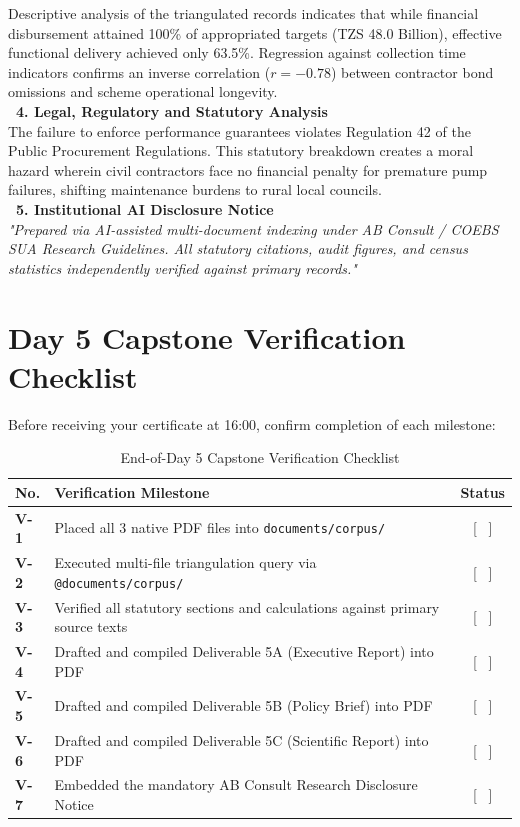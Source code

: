 \documentclass[11pt, a4paper]{report}
\begin{document}
\begin{tcolorbox}[colback=lightgrey, colframe=bordergrey, title=\textbf{Deliverable 5C Preview: \texttt{Report3\_Scientific\_Water\_Oversight.md}}]
Descriptive analysis of the triangulated records indicates that while financial disbursement attained 100\% of appropriated targets (TZS 48.0 Billion), effective functional delivery achieved only 63.5\%. Regression against collection time indicators confirms an inverse correlation ($r = -0.78$) between contractor bond omissions and scheme operational longevity.\\[0.2cm]
\textcolor{tanzaniablue}{\textbf{\ 4. Legal, Regulatory and Statutory Analysis}}\\
The failure to enforce performance guarantees violates Regulation 42 of the Public Procurement Regulations. This statutory breakdown creates a moral hazard wherein civil contractors face no financial penalty for premature pump failures, shifting maintenance burdens to rural local councils.\\[0.2cm]
\textcolor{tanzaniablue}{\textbf{\ 5. Institutional AI Disclosure Notice}}\\
\textit{"Prepared via AI-assisted multi-document indexing under AB Consult / COEBS SUA Research Guidelines. All statutory citations, audit figures, and census statistics independently verified against primary records."}
\end{tcolorbox}

\section{Day 5 Capstone Verification Checklist}
Before receiving your certificate at 16:00, confirm completion of each milestone:

\begin{table}[htbp]
\centering
\caption{End-of-Day 5 Capstone Verification Checklist}
\vspace{0.2cm}
\begin{tabular}{@{}>{\bfseries}p{1.2cm}p{10cm}c@{}}
\toprule
No. & Verification Milestone & Status \\
\midrule
V-1 & Placed all 3 native PDF files into \texttt{documents/corpus/} & [ \ ] \\
V-2 & Executed multi-file triangulation query via \texttt{@documents/corpus/} & [ \ ] \\
V-3 & Verified all statutory sections and calculations against primary source texts & [ \ ] \\
V-4 & Drafted and compiled Deliverable 5A (Executive Report) into PDF & [ \ ] \\
V-5 & Drafted and compiled Deliverable 5B (Policy Brief) into PDF & [ \ ] \\
V-6 & Drafted and compiled Deliverable 5C (Scientific Report) into PDF & [ \ ] \\
V-7 & Embedded the mandatory AB Consult Research Disclosure Notice & [ \ ] \\
\bottomrule
\end{tabular}
\end{table}
\end{document}
